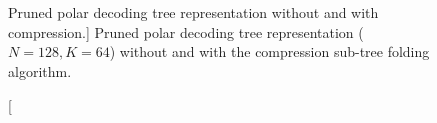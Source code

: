 \begin{figure}[htp]
  \centering
  \\
  \\
  \caption
    [Pruned polar decoding tree representation without and with compression.]
    {Pruned polar decoding tree representation ($N = 128, K = 64$) without
    and with the compression sub-tree folding algorithm.}
  \label{fig:opt_polar_sc_gen_compression}
\end{figure}

